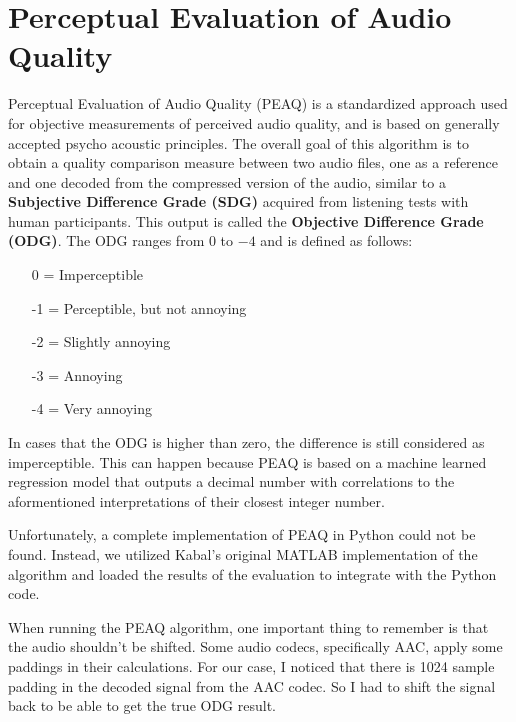 \section{Perceptual Evaluation of Audio Quality}
\label{sec:peaq}

Perceptual Evaluation of Audio Quality (PEAQ) \cite{peaq} is a standardized approach used for objective measurements of perceived audio quality, and is based on generally accepted psycho acoustic principles. The overall goal of this algorithm is to obtain a quality comparison measure between two audio files, one as a reference and one decoded from the compressed version of the audio, similar to a \textbf{Subjective Difference Grade (SDG)} acquired from listening tests with human participants. This output is called the \textbf{Objective Difference Grade (ODG)}. The ODG ranges from $0$ to $-4$ and is defined as follows:

\begin{enumerate}[noitemsep]
    \item [0] = Imperceptible
    \item [-1] = Perceptible, but not annoying
    \item [-2] = Slightly annoying
    \item [-3] = Annoying
    \item [-4] = Very annoying
\end{enumerate}

In cases that the ODG is higher than zero, the difference is still considered as imperceptible. This can happen because PEAQ is based on a machine learned regression model that outputs a decimal number with 
correlations to the aformentioned interpretations of their closest integer number.


Unfortunately, a complete implementation of PEAQ in Python could not be found. Instead, we utilized Kabal's original MATLAB implementation of the algorithm \cite{kabal2002examination} and loaded the results of the evaluation to integrate with the Python code.

When running the PEAQ algorithm, one important thing to remember is that the audio shouldn't be shifted. Some audio codecs, specifically AAC, apply some paddings in their calculations. For our case, I noticed that there is 1024 sample padding in the decoded signal from the AAC codec. So I had to shift the signal back to be able to get the true ODG result.


